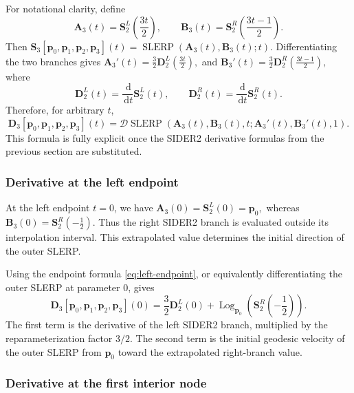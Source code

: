 \documentclass[a4paper,11pt]{article}
\newcommand{\bp}{\mathbf{p}}
\newcommand{\bA}{\mathbf{A}}
\newcommand{\bB}{\mathbf{B}}
\newcommand{\bD}{\mathbf{D}}
\newcommand{\Log}{\operatorname{Log}}
\numberwithin{equation}{section}
\theoremstyle{plain}
\theoremstyle{definition}
\theoremstyle{remark}
\newcommand{\slerp}{\operatorname{SLERP}}
\newcommand{\dd}{\,\mathrm{d}}
\begin{document}
For notational clarity, define
\[
        \bA_3(t)
        =
        \mathbf{S}_2^L\!\left(\frac{3t}{2}\right),
        \qquad
        \bB_3(t)
        =
        \mathbf{S}_2^R\!\left(\frac{3t-1}{2}\right).
\]
Then
\(\mathbf{S}_3[\bp_0,\bp_1,\bp_2,\bp_3](t) = \slerp(\bA_3(t),\bB_3(t);t).\)
Differentiating the two branches gives
\(\bA_3'(t) = \frac32 \bD_2^L\!\left(\frac{3t}{2}\right),\)
and
\(\bB_3'(t) = \frac32 \bD_2^R\!\left(\frac{3t-1}{2}\right),\)
where
\[
        \bD_2^L(t)
        =
        \frac{\dd}{\dd t}\mathbf{S}_2^L(t),
        \qquad
        \bD_2^R(t)
        =
        \frac{\dd}{\dd t}\mathbf{S}_2^R(t).
\]
Therefore, for arbitrary $t$,
\begin{equation}
\label{eq:d3-general}
\boxed{
        \bD_3[\bp_0,\bp_1,\bp_2,\bp_3](t)
        =
        \mathcal{D}\slerp
        \left(
        \bA_3(t),\bB_3(t),t;
        \bA_3'(t),\bB_3'(t),1
        \right).
}
\end{equation}
This formula is fully explicit once the SIDER2 derivative formulas from the previous section are substituted.

\subsubsection{Derivative at the left endpoint}

At the left endpoint $t=0$, we have
\(\bA_3(0) = \mathbf{S}_2^L(0) = \bp_0,\)
whereas
\(\bB_3(0) = \mathbf{S}_2^R\!\left(-\frac12\right).\)
Thus the right SIDER2 branch is evaluated outside its interpolation interval.  This extrapolated value determines the initial direction of the outer SLERP.

Using the endpoint formula \eqref{eq:left-endpoint}, or equivalently differentiating the outer SLERP at parameter $0$, gives
\[
\boxed{
        \bD_3[\bp_0,\bp_1,\bp_2,\bp_3](0)
        =
        \frac32\bD_2^L(0)
        +
        \Log_{\bp_0}\!\left(
        \mathbf{S}_2^R\!\left(-\frac12\right)
        \right).
}
\]
The first term is the derivative of the left SIDER2 branch, multiplied by the reparameterization factor $3/2$.  The second term is the initial geodesic velocity of the outer SLERP from $\bp_0$ toward the extrapolated right-branch value.

\subsubsection{Derivative at the first interior node}
\end{document}
